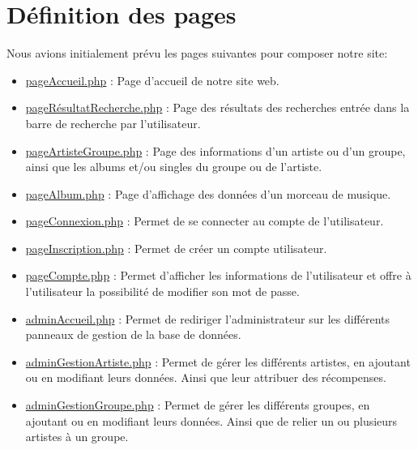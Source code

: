 
    \newpage
    
\section{Définition des pages}

	    	\begin{paragraphe}
	    	    Nous avions initialement prévu les pages suivantes pour composer notre site:\\
        		\begin{itemize}
        			\item \underline{pageAccueil.php} : Page d'accueil de notre site web.
        			\item \underline{pageRésultatRecherche.php} : Page des résultats des recherches entrée dans la barre de recherche par l'utilisateur.
        			\item \underline{pageArtisteGroupe.php} : Page des informations d'un artiste ou d'un groupe, ainsi que les albums et/ou singles du groupe ou de l'artiste.
        			\item \underline{pageAlbum.php} : Page d'affichage des données d'un morceau de musique.
        		\end{itemize}
                \vspace{1em}
                \begin{itemize}
        			\item \underline{pageConnexion.php} : Permet de se connecter au compte de l'utilisateur.
        			\item \underline{pageInscription.php} : Permet de créer un compte utilisateur.
        			\item \underline{pageCompte.php} : Permet d'afficher les informations de l'utilisateur et offre à l'utilisateur la possibilité de modifier son mot de passe.
        		\end{itemize}
                \vspace{1em}
        		\begin{itemize}
        			\item \underline{adminAccueil.php} : Permet de rediriger l'administrateur sur les différents panneaux de gestion de la base de données.
        			\item \underline{adminGestionArtiste.php} : Permet de gérer les différents artistes, en ajoutant ou en modifiant leurs données. Ainsi que leur attribuer des récompenses.
        			\item \underline{adminGestionGroupe.php} : Permet de gérer les différents groupes, en ajoutant ou en modifiant leurs données. Ainsi que de relier un ou plusieurs artistes à un groupe.

\end{itemize}
\end{paragraphe}
